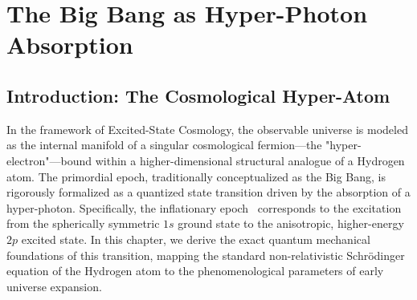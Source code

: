 \section{The Big Bang as Hyper-Photon Absorption}

\subsection{Introduction: The Cosmological Hyper-Atom}
In the framework of Excited-State Cosmology, the observable universe is modeled as the internal manifold of a singular cosmological fermion---the "hyper-electron"---bound within a higher-dimensional structural analogue of a Hydrogen atom. The primordial epoch, traditionally conceptualized as the Big Bang, is rigorously formalized as a quantized state transition driven by the absorption of a hyper-photon. Specifically, the inflationary epoch~\cite{Guth1981} corresponds to the excitation from the spherically symmetric $1s$ ground state to the anisotropic, higher-energy $2p$ excited state. In this chapter, we derive the exact quantum mechanical foundations of this transition, mapping the standard non-relativistic Schr\"odinger equation of the Hydrogen atom to the phenomenological parameters of early universe expansion.

